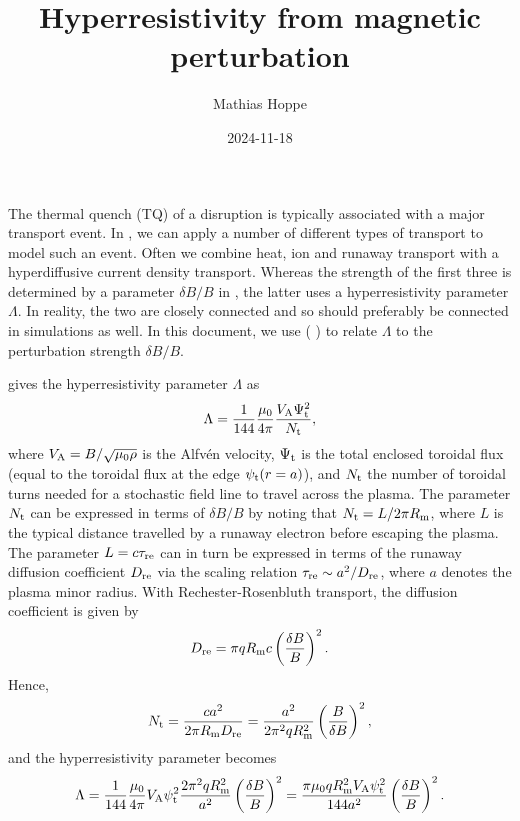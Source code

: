 \documentclass{notes}
\title{Hyperresistivity from magnetic perturbation}
\author{Mathias Hoppe}
\date{2024-11-18}
\newcommand{\citep}[1]{(\citename{#1}{author} \citefield{#1}{year})}
\begin{document}
	\maketitle

	The thermal quench (TQ) of a disruption is typically associated with a major
	transport event. In \DREAM, we can apply a number of different types of
	transport to model such an event. Often we combine heat, ion and runaway
	transport with a hyperdiffusive current density transport. Whereas the
	strength of the first three is determined by a parameter $\delta B/B$ in
	\DREAM, the latter uses a hyperresistivity parameter $\Lambda$. In reality,
	the two are closely connected and so should preferably be connected in
	simulations as well. In this document, we use \citep{Boozer2017} to
	relate $\Lambda$ to the perturbation strength $\delta B/B$.

	\cite{Boozer2017} gives the hyperresistivity parameter $\Lambda$ as
	\begin{equation}
		\Lambda =
			\frac{1}{144}
			\frac{\mu_0}{4\pi}
			\frac{V_{\rm A}\Psi_{\rm t}^2}{N_{\rm t}},
	\end{equation}
	where $V_{\rm A}=B/\sqrt{\mu_0\rho}$ is the Alfvén velocity,
	$\Psi_{\rm t}$ is the total enclosed toroidal flux (equal to the toroidal
	flux at the edge $\psi_{\rm t}(r=a)$), and $N_{\rm t}$ the number of
	toroidal turns needed for a stochastic field line to travel across the
	plasma. The parameter $N_{\rm t}$ can be expressed in terms of $\delta B/B$
	by noting that $N_{\rm t} = L/2\pi R_{\rm m}$, where $L$ is the typical
	distance travelled by a runaway electron before escaping the plasma. The
	parameter $L=c\tau_{\rm re}$ can in turn be expressed in terms of the
	runaway diffusion coefficient $D_{\rm re}$ via the scaling relation
	$\tau_{\rm re}\sim a^2/D_{\rm re}$, where $a$ denotes the plasma minor
	radius. With Rechester-Rosenbluth transport, the diffusion coefficient is
	given by
	\begin{equation}
		D_{\rm re} = \pi qR_{\rm m}c\left(\frac{\delta B}{B}\right)^2.
	\end{equation}
	Hence,
	\begin{equation}
		N_{\rm t} = \frac{c a^2}{2\pi R_{\rm m} D_{\rm re}} =
			\frac{a^2}{2\pi^2 q R_{\rm m}^2}\left(
				\frac{B}{\delta B}
			\right)^2,
	\end{equation}
	and the hyperresistivity parameter becomes
	\begin{equation}\label{eq:Lambda}
		\Lambda =
			\frac{1}{144}
			\frac{\mu_0}{4\pi}
			V_{\rm A}\psi_{\rm t}^2
			\frac{2\pi^2 qR_{\rm m}^2}{a^2}\left(
				\frac{\delta B}{B}
			\right)^2 =
			\frac{\pi \mu_0 qR_{\rm m}^2 V_{\rm A}\psi_{\rm t}^2}{144a^2}
			\left(
				\frac{\delta B}{B}
			\right)^2.
	\end{equation}
\end{document}
